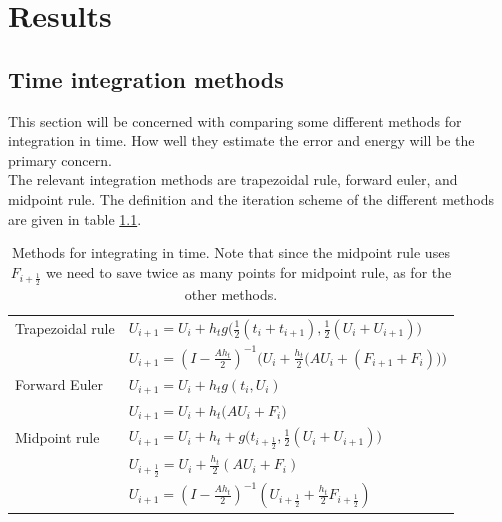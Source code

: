 \chapter{Results}

\section{Time integration methods} %
This section will be concerned with comparing some different methods for integration in time. How well they estimate the error and energy will be the primary concern.\\

The relevant integration methods are trapezoidal rule, forward euler, and midpoint rule. The definition and the iteration scheme of the different methods are given in table \ref{tab:intmet}. 

\begin{table}
\begin{tabular}{l l}
	Trapezoidal rule \cite{trapezoidal} & $U_{i+1} = U_{i}+h_t g \Big( \frac{1}{2}(t_i+t_{i+1}),\frac{1}{2}(U_i+U_{i+1}) \Big)$
	\\ & $U_{i+1} = (I- \frac{A h_t}{2}) ^{-1} \Big(  U_i + \frac{h_t}{2} \big( A U_i+(F_{i+1}+F_i) \big)  \Big) $\\
\hline	
	Forward Euler \cite{forwardeuler} & $ U_{i+1} = U_i + h_t g ( t_i, U_i ) $ \\ & $ U_{i+1} = U_i + h_t \big( A U_i + F_i \big) $ \\
	\hline
	Midpoint rule \cite{midpoint} & $U_{i+1} = U_i + h_t + g \Big(  t_{i+\frac{1}{2}} , \frac{1}{2}(U_i + U_{i+1})    \Big) $ \\ & 
	$U_{i+\frac{1}{2}} = U_i + \frac{h_t}{2} ( A U_i + F_i )$ \\ &
    $U_{i+1} = (I-\frac{A h_t}{2}) ^{-1} (U_{i+\frac{1}{2}} + \frac{h_t}{2} F_{i+ \frac{1}{2}})$
\end{tabular}

\caption{Methods for integrating in time. Note that since the midpoint rule uses $F_{i+\frac{1}{2}}$ we need to save twice as many points for midpoint rule, as for the other methods.} 
\label{tab:intmet}
\end{table}


